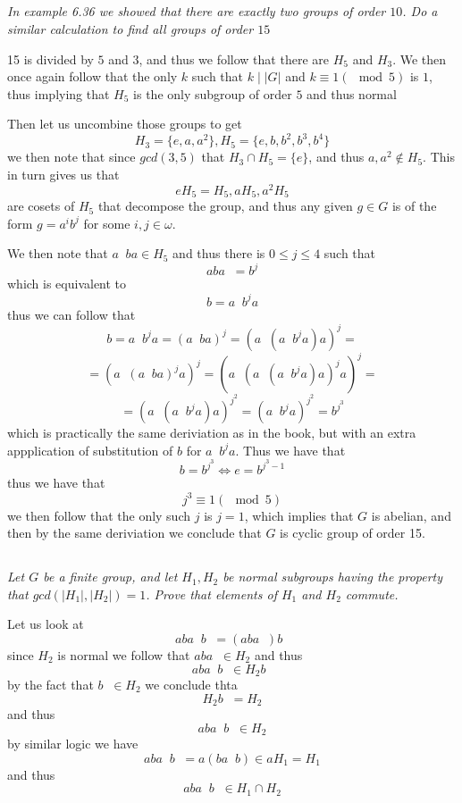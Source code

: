\documentclass[11pt,oneside,titlepage]{book}
\DeclareMathOperator \inv {^{-1}}
\DeclareMathOperator \lra {\Leftrightarrow}
\newcommand{\set}[1]{\{ #1 \}}
\begin{document}
\subsection{}

\textit{In example 6.36 we showed that there are exactly two groups of
  order $10$. Do a similar calculation to find all groups of order $15$}

15 is divided by $5$ and $3$, and thus we follow that there are $H_5$
and $H_3$. We then once again follow that the only $k$ such that
$k \mid |G|$ and $k \equiv 1 (\mod 5)$ is $1$, thus implying that
$H_5$ is the only subgroup of order $5$ and thus normal

Then let us uncombine those groups to get
$$H_3 = \set{e, a, a^2}, H_5 = \set{e, b, b^2, b^3, b^4}$$
we then note that since $gcd(3, 5)$ that $H_3 \cap H_5 = \set{e}$,
and thus $a, a^2 \notin H_5$. This in turn gives us that
$$eH_5 = H_5, aH_5, a^2H_5$$
are cosets of $H_5$ that decompose the group, and thus any given
$g \in G$ is of the form $g = a^ib^j$ for some $i, j \in \omega$.

We then note that $a\inv ba \in H_5$ and thus there is $0 \leq j \leq 4$
such that
$$a b a\inv = b^j$$
which is equivalent to
$$b = a\inv b^j a$$
thus we can follow that
$$b = a\inv b^j a = (a\inv b a)^j = (a\inv (a\inv b^j a) a)^j = $$
$$ = (a\inv (a\inv b a)^j a)^j = (a\inv (a\inv (a\inv b^j a) a)^j a)^j = $$
$$ = (a\inv (a\inv b^j a) a)^{j^2} = (a\inv b^j a)^{j^2} = b^{j^3}$$
which is practically the same deriviation as in the book, but with an
extra appplication of substitution of $b$ for $a\inv b^j a$.
Thus we have that
$$b = b^{j^3} \lra e = b^{j^3 - 1}$$
thus we have that
$$j^3 \equiv 1 (\mod 5)$$
we then follow that the only such $j$ is $j = 1$, which implies that
$G$ is abelian, and then by the same deriviation we conclude that $G$
is cyclic group of order 15. 

\subsection{}

\textit{Let $G$ be a finite group, and let $H_1, H_2$ be normal subgroups
  having the property that $gcd(|H_1|, |H_2|) = 1$. Prove that elements
  of $H_1$ and $H_2$ commute.}

Let us look at
$$aba\inv b\inv = (a b a\inv) b\inv $$
since $H_2$ is normal we follow that $aba\inv \in H_2$ and thus
$$aba\inv b\inv \in H_2 b\inv$$
by the fact that $b\inv \in H_2$ we conclude thta
$$H_2 b\inv = H_2$$
and thus
$$aba\inv b\inv \in H_2$$
by similar logic we have
$$aba\inv b\inv = a(ba\inv b) \in a H_1 = H_1$$
and thus
$$aba\inv b\inv \in H_1 \cap H_2$$
\end{document}

